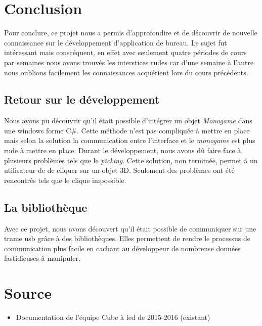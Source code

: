 \documentclass[a4paper,12pt]{article}
\begin{document}
\section{Conclusion}
Pour conclure, ce projet nous a permis d'approfondire et de découvrir de nouvelle connaissance sur le développement d'application de bureau. Le sujet fut intéressant mais conscéquent, en effet avec seulement quatre périodes de cours par semaines nous avons trouvés les interstices rudes car d'une semaine à l'autre nous oublions facilement les connaissances acquérient lors du cours précédents.

\subsection{Retour sur le développement}
Nous avons pu découvrir qu'il était possible d'intégrer un objet \emph{Monogame} dans une windows forme C\#. Cette méthode n'est pas compliquée à mettre en place mais selon la solution la communication entre l'interface et le \emph{monogame} est plus rude à mettre en place. Durant le développement, nous avons dû faire face à plusieurs problèmes tels que le \emph{picking}. Cette solution, non terminée, permet à un utilisateur de de cliquer sur un objet 3D. Seulement des problèmes ont été rencontrés tels que le clique impossible.

\subsection{La bibliothèque}
Avec ce projet, nous avons découvert qu'il était possible de communiquer sur une trame usb grâce à des bibliothèques. Elles permettent de rendre le processus de communication plus facile en cachant au développeur de nombreuse données fastidieuses à manipuler.
\newpage

\section{Source}
\begin{itemize}
	\item Documentation de l'équipe Cube à led de 2015-2016 (existant)
\end{itemize}

\newpage
\listoffigures
\end{document}
